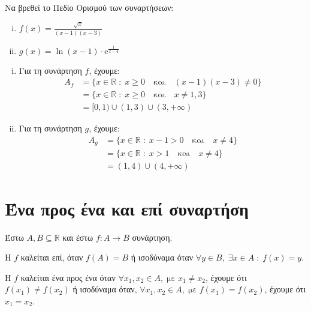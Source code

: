 \documentclass[a4paper,table]{report}
\begin{document}
\begin{exercise}
  Να βρεθεί το Πεδίο Ορισμού των συναρτήσεων:
  \begin{enumerate}[i)]
    \item $ f(x) = \frac{\sqrt{x}}{(x-1)(x-3)} $
    \item $ g(x) = \ln{(x-1)} \cdot \mathrm{e}^{\frac{1}{x-4}} $
  \end{enumerate}
\end{exercise}
\begin{solution}
\item {}
  \begin{enumerate}[i)]
    \item Για τη συνάρτηση $f$, έχουμε:
      \begin{align*}
        A_{f} &= \{ x \in \mathbb{R} \; : \; x \geq 0 \quad \text{και} \quad (x-1)(x-3)
        \neq 0 \} \\ 
              &= \{ x \in \mathbb{R} \; : \; x \geq 0 \quad
              \text{και} \quad x \neq 1,3 \} \\ 
              &= [0,1) \cup (1,3) \cup (3, + \infty) 
        \end{align*} 
      \item Για τη συνάρτηση $g$, έχουμε:
        \begin{align*}
          A_{g} &= \{ x \in \mathbb{R} \; : \; x-1 > 0 \quad \text{και} \quad x \neq 4 \}
          \\
                &= \{ x \in \mathbb{R} \; : \; x > 1 \quad \text{και} \quad x \neq 4 \} 
             \\ 
                &= (1,4) \cup (4, + \infty)
        \end{align*} 
    \end{enumerate}
\end{solution}

\section{Ένα προς ένα και επί συναρτήση}

\begin{dfn}
  Έστω $ A, B \subseteq \mathbb{R} $ και έστω $ f \colon A \to B $ συνάρτηση. 
  \begin{myitemize}
    \item Η $f$ καλείται \textcolor{Col1}{επί}, όταν $ f(A) = B $ ή ισοδύναμα όταν 
      $ \forall y \in B, \; \exists x \in A \; : \; f(x)=y $. 
    \item Η $f$ καλείται \textcolor{Col1}{ένα προς ένα} όταν 
      $ \forall x_{1}, x_{2} \in A, \; \text{με} \; x_{1} \neq x_{2} $, έχουμε ότι 
      $ f(x_{1}) \neq f(x_{2}) $ ή ισοδύναμα όταν, 
      $ \forall x_{1}, x_{2} \in A, \; \text{με} \; f(x_{1}) = f(x_{2}) $, έχουμε ότι 
      $ x_{1}= x_{2} $.
  \end{myitemize}
\end{dfn}
\end{document}
